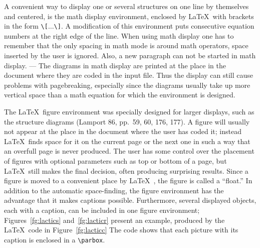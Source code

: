  A convenient way to display one or several structures on one
 line by themselves and centered, is the math display environment,
 enclosed by \LaTeX\  with brackets in the form \verb+\[+$\ldots $\verb+\]+.
 A modification of this environment puts
 consecutive equation numbers at the right edge of the line.
 When using math display one has to remember that the only
 spacing in math mode is around math operators, space inserted
 by the user is ignored. Also, a new
 paragraph can not be started in math display. ---
 The diagrams in math display are printed at the place in
 the document where they are coded in the input file.
 Thus the display can still cause problems with pagebreaking,
 especially since the diagrams usually take up more vertical
 space than a math equation for which the environment is
 designed.
 
 The \LaTeX\  figure environment was specially designed for larger
 displays, such as the structure diagrams (Lamport 86, pp.~59, 60,
 176, 177). A figure will usually not appear at the place in the
 document where the user has coded it; instead \LaTeX\  finds space
 for it on the current page or the next one in such a way that
 an overfull page is never produced. The user has some control
 over the placement of figures with optional parameters such as
 top or bottom of a page, but \LaTeX\  still makes the final
 decision, often producing surprising results.
 Since a figure is moved to a convenient place by
 \LaTeX\ , the figure is called a ``float.''  In addition to the
 automatic space-finding, the figure environment has the
 advantage that it makes captions possible. Furthermore,
 several displayed objects, each with a caption, can be included
 in one figure environment; Figures~\ref{fg:lactics} and~\ref{fg:lacticr}
 present an
 example, produced by the \LaTeX\  code in Figure~\ref{fg:lacticc}
 The code shows that each picture with its caption is enclosed in
 a \verb+\parbox+.
 
